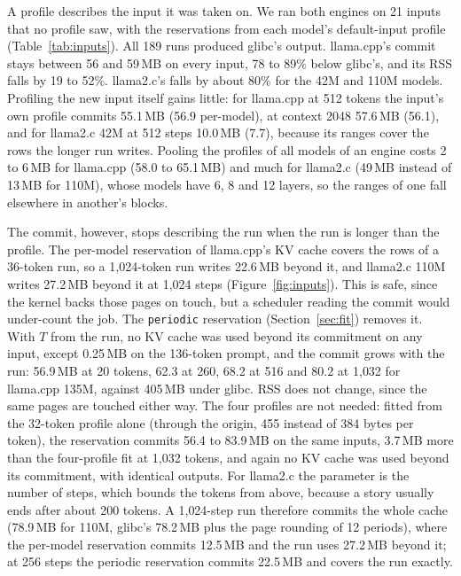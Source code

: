 \documentclass[11pt]{article}
\newcommand{\secref}[1]{Section~\ref{#1}}
\newcommand{\figref}[1]{Figure~\ref{#1}}
\newcommand{\tabref}[1]{Table~\ref{#1}}
\begin{document}
A profile describes the input it was taken on. We ran both engines on 21 inputs that no profile saw, with the
reservations from each model's default-input profile (\tabref{tab:inputs}). All 189 runs produced glibc's output.
llama.cpp's commit stays between 56 and 59\,MB on every input, 78 to 89\% below glibc's, and its RSS falls by 19 to 52\%.
llama2.c's falls by about 80\% for the 42M and 110M models. Profiling the new input itself gains little: for
llama.cpp at 512 tokens the input's own profile commits 55.1\,MB (56.9 per-model), at context 2048 57.6\,MB (56.1),
and for llama2.c 42M at 512 steps 10.0\,MB (7.7), because its ranges cover the rows the longer run writes.
Pooling the profiles of all models of an engine costs 2 to 6\,MB for llama.cpp (58.0 to 65.1\,MB) and much for
llama2.c (49\,MB instead of 13\,MB for 110M), whose models have 6, 8 and 12 layers, so the ranges of one fall
elsewhere in another's blocks.

The commit, however, stops describing the run when the run is longer than the profile. The per-model reservation
of llama.cpp's KV cache covers the rows of a 36-token run, so a 1{,}024-token run writes 22.6\,MB beyond it, and
llama2.c 110M writes 27.2\,MB beyond it at 1{,}024 steps (\figref{fig:inputs}). This is safe, since the kernel
backs those pages on touch, but a scheduler reading the commit would under-count the job. The \texttt{periodic}
reservation (\secref{sec:fit}) removes it. With $T$ from the run, no KV cache was used beyond its commitment on
any input, except 0.25\,MB on the 136-token prompt, and the commit grows with the run: 56.9\,MB at 20 tokens, 62.3
at 260, 68.2 at 516 and 80.2 at 1{,}032 for llama.cpp 135M, against 405\,MB under glibc. RSS does not change, since
the same pages are touched either way. The four profiles are not needed: fitted from the 32-token profile
alone (through the origin, 455 instead of 384 bytes per token), the reservation commits 56.4 to 83.9\,MB on the
same inputs, 3.7\,MB more than the four-profile fit at 1{,}032 tokens, and again no KV cache was used beyond its
commitment, with identical outputs. For llama2.c the parameter is the number of steps, which bounds the tokens
from above, because a story usually ends after about 200 tokens. A 1{,}024-step run therefore commits the whole
cache (78.9\,MB for 110M, glibc's 78.2\,MB plus the page rounding of 12 periods), where the per-model reservation
commits 12.5\,MB and the run uses 27.2\,MB beyond it; at 256 steps the periodic reservation commits 22.5\,MB and
covers the run exactly.
\end{document}
